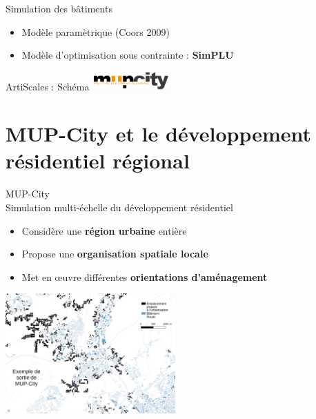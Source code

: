\documentclass[xcolor=table]{beamer}
\begin{document}
\begin{frame}{Simulation des bâtiments}
	\begin{itemize}
		\item Modèle paramètrique (Coors 2009)
		\item Modèle d'optimisation sous contrainte	: \textbf{SimPLU}
	\end{itemize}
\end{frame}

\begin{frame}{ArtiScales : Schéma}
	\includegraphics[width=3cm]{Images/mup.png}
\end{frame}




\section[MUP-City]{MUP-City et le développement résidentiel régional}




\begin{frame}{MUP-City}
	\\
	Simulation multi-échelle du développement résidentiel 
	\begin{itemize}
		\item Considère une \textbf{région urbaine} entière
		\item Propose une \textbf{organisation spatiale locale}
		\item Met en œuvre différentes \textbf{orientations d'aménagement}
	\end{itemize}
	\includegraphics[width=6.5cm]{Images/ex-sorties-mup.png}
\end{frame}
\end{document}
